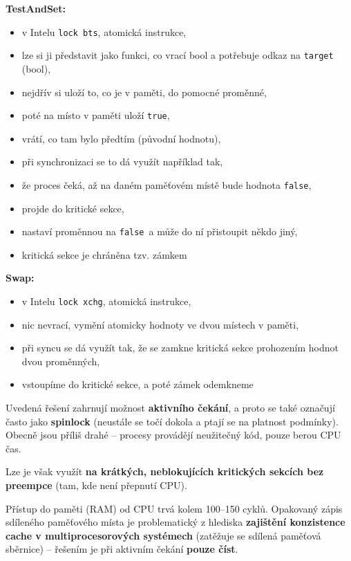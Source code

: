 \documentclass[a4paper, 11pt]{article}
\newcommand{\tcmd}[1]{\texttt{#1}}
\newcommand{\ttrue}{\texttt{true}}
\newcommand{\tfalse}{\texttt{false}}
\begin{document}
\textbf{TestAndSet:}
\begin{itemize}
    \item v Intelu \tcmd{lock bts}, atomická instrukce,
    \item lze si ji představit jako funkci, co vrací bool a potřebuje odkaz na \tcmd{target} (bool),
    \item nejdřív si uloží to, co je v paměti, do pomocné proměnné,
    \item poté na místo v paměti uloží \ttrue, 
    \item vrátí, co tam bylo předtím (původní hodnotu),
    \item při synchronizaci se to dá využít například tak, 
    \item že proces čeká, až na daném paměťovém místě bude hodnota \tfalse,
    \item projde do kritické sekce,
    \item nastaví proměnnou na \tfalse\ a může do ní přistoupit někdo jiný,
    \item kritická sekce je chráněna tzv. zámkem
\end{itemize}
 
\textbf{Swap:}
\begin{itemize}
    \item v Intelu \tcmd{lock xchg}, atomická instrukce,
    \item nic nevrací, vymění atomicky hodnoty ve dvou místech v paměti,
    \item při syncu se dá využít tak, že se zamkne kritická sekce prohozením hodnot dvou proměnných,
    \item vstoupíme do kritické sekce, a poté zámek odemkneme
\end{itemize}
 
Uvedená řešení zahrnují možnost \textbf{aktivního čekání}, a proto se také označují často jako \textbf{spinlock} (neustále se točí dokola a ptají se na platnost podmínky). Obecně jsou příliš drahé -- procesy provádějí neužitečný kód, pouze berou CPU čas. 
 
Lze je však využít \textbf{na krátkých, neblokujících kritických sekcích bez preempce} (tam, kde není přepnutí CPU).
 
Přístup do paměti (RAM) od CPU trvá kolem 100--150 cyklů. Opakovaný zápis sdíleného paměťového místa je problematický z hlediska \textbf{zajištění konzistence cache v multiprocesorových systémech} (zatěžuje se sdílená paměťová sběrnice) -- řešením je při aktivním čekání \textbf{pouze číst}.
\end{document}

